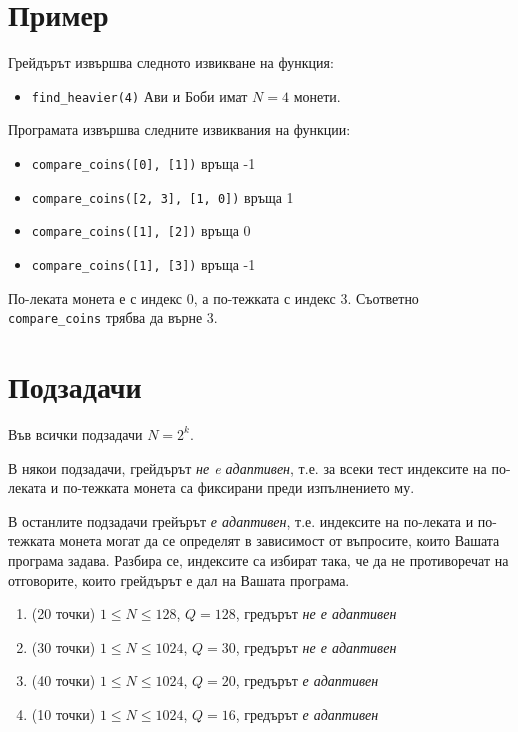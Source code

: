 \documentclass[a4paper,11pt]{article}
\newcommand{\code}[1]{\texttt{#1}}
\newcommand{\noskip}{\vspace{-\parskip}}
\begin{document}
\section*{Пример}
Грейдърът извършва следното извикване на функция:
\noskip
\begin{itemize}
    \item \code{find\_heavier(4)} Ави и Боби имат $N=4$ монети.
\end{itemize}
Програмата извършва следните извиквания на функции:
\noskip
\begin{itemize}
    \item \code{compare\_coins([0], [1])} връща -1
    \item \code{compare\_coins([2, 3], [1, 0])} връща 1
    \item \code{compare\_coins([1], [2])} връща 0 
    \item \code{compare\_coins([1], [3])} връща -1
\end{itemize}

По-леката монета е с индекс $0$, а по-тежката с индекс $3$.
Съответно \code{compare\_coins} трябва да върне $3$.

\section*{Подзадачи}
Във всички подзадачи $N = 2^k$.

В някои подзадачи, грейдърът \textit{не e адаптивен}, т.е. за всеки тест
индексите на по-леката и по-тежката монета са фиксирани преди изпълнението му.

В останлите подзадачи грейърът \textit{е адаптивен}, т.е. индексите на по-леката
и по-тежката монета могат да се определят в зависимост от въпросите, които
Вашата програма задава.
Разбира се, индексите са избират така, че да не противоречат на отговорите,
които грейдърът е дал на Вашата програма.

\begin{enumerate}
    \item (20 точки) $1 \leq N \leq 128$, $Q = 128$, гредърът
        \textit{не е адаптивен}
    \item (30 точки) $1 \leq N \leq 1024$, $Q = 30$, гредърът
        \textit{не е адаптивен}
    \item (40 точки) $1 \leq N \leq 1024$, $Q = 20$, гредърът
        \textit{е адаптивен}
    \item (10 точки) $1 \leq N \leq 1024$, $Q = 16$, гредърът
        \textit{е адаптивен}
\end{enumerate}
\end{document}
